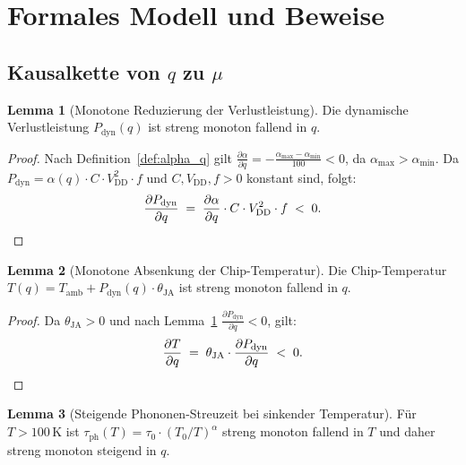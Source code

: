 ﻿\documentclass[a4paper,12pt]{article}
\theoremstyle{definition}
\newtheorem{lemma}{Lemma}
\begin{document}
\section{Formales Modell und Beweise}

\subsection{Kausalkette von $q$ zu $\mu$}

\begin{lemma}[Monotone Reduzierung der Verlustleistung]
\label{lem:verlust}
Die dynamische Verlustleistung $P_{\mathrm{dyn}}(q)$ ist streng monoton fallend in $q$.
\end{lemma}

\begin{proof}
Nach Definition~\ref{def:alpha_q} gilt
$\frac{\partial \alpha}{\partial q} = -\frac{\alpha_{\mathrm{max}} - \alpha_{\mathrm{min}}}{100} < 0$,
da $\alpha_{\mathrm{max}} > \alpha_{\mathrm{min}}$. Da $P_{\mathrm{dyn}} = \alpha(q) \cdot C \cdot V_{\mathrm{DD}}^2 \cdot f$
und $C, V_{\mathrm{DD}}, f > 0$ konstant sind, folgt:
\[
\frac{\partial P_{\mathrm{dyn}}}{\partial q} \;=\; \frac{\partial \alpha}{\partial q} \cdot C \cdot V_{\mathrm{DD}}^2 \cdot f \;<\; 0. \qedhere
\]
\end{proof}

\begin{lemma}[Monotone Absenkung der Chip-Temperatur]
\label{lem:temp}
Die Chip-Temperatur $T(q) = T_{\mathrm{amb}} + P_{\mathrm{dyn}}(q) \cdot \theta_{\mathrm{JA}}$
ist streng monoton fallend in $q$.
\end{lemma}

\begin{proof}
Da $\theta_{\mathrm{JA}} > 0$ und nach Lemma~\ref{lem:verlust}
$\frac{\partial P_{\mathrm{dyn}}}{\partial q} < 0$, gilt:
\[
\frac{\partial T}{\partial q} \;=\; \theta_{\mathrm{JA}} \cdot \frac{\partial P_{\mathrm{dyn}}}{\partial q} \;<\; 0. \qedhere
\]
\end{proof}

\begin{lemma}[Steigende Phononen-Streuzeit bei sinkender Temperatur]
\label{lem:tau}
Für $T > 100\,\text{K}$ ist $\tau_{\mathrm{ph}}(T) = \tau_0 \cdot (T_0/T)^\alpha$ streng
monoton fallend in $T$ und daher streng monoton steigend in $q$.
\end{lemma}
\end{document}
